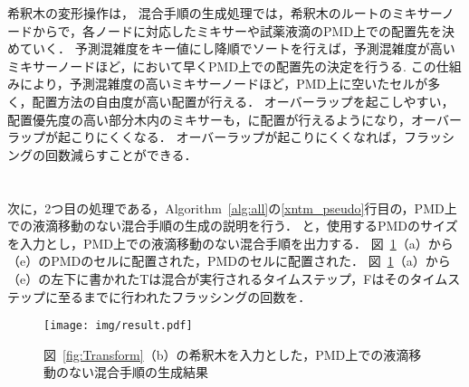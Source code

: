 希釈木の変形操作は，
混合手順の生成処理では，希釈木のルートのミキサーノードからで，各ノードに対応したミキサーや試薬液滴のPMD上での配置先を決めていく．
予測混雑度をキー値にし降順でソートを行えば，予測混雑度が高いミキサーノードほど，において早くPMD上での配置先の決定を行うる.
この仕組みにより，予測混雑度の高いミキサーノードほど，PMD上に空いたセルが多く，配置方法の自由度が高い配置が行える．
オーバーラップを起こしやすい，配置優先度の高い部分木内のミキサーも，に配置が行えるようになり，オーバーラップが起こりにくくなる．
オーバーラップが起こりにくくなれば，フラッシングの回数減らすことができる．





\section{}
次に，2つ目の処理である，Algorithm~\ref{alg:all}の\ref{xntm_pseudo}行目の，PMD上での液滴移動のない混合手順の生成の説明を行う．
と，使用するPMDのサイズを入力とし，PMD上での液滴移動のない混合手順を出力する．
図~\ref{fig:result}（a）から（e）のPMDのセルに配置された，PMDのセルに配置された．
図~\ref{fig:result}（a）から（e）の左下に書かれたTは混合が実行されるタイムステップ，Fはそのタイムステップに至るまでに行われたフラッシングの回数を．

\begin{figure}[tbp]
 \centering\texttt{[image: img/result.pdf]}
    \caption{図~\ref{fig:Transform}（b）の希釈木を入力とした，PMD上での液滴移動のない混合手順の生成結果}\label{fig:result}
\end{figure}



